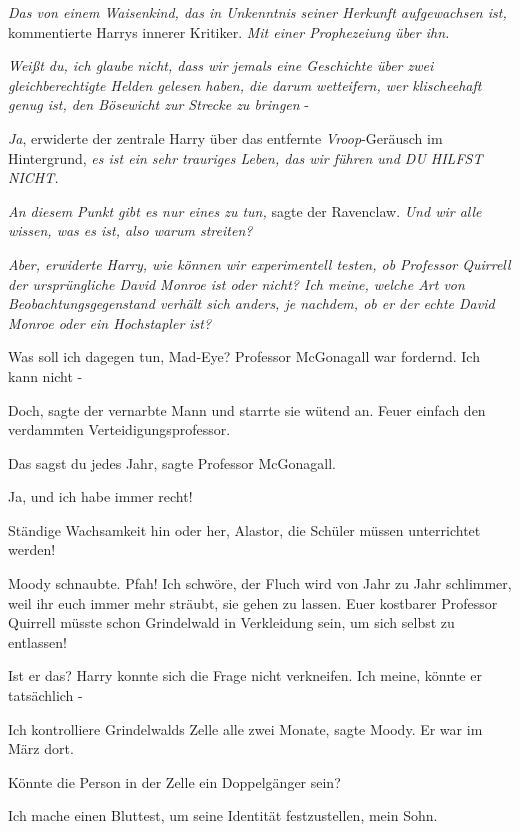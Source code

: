 \emph{Das von einem Waisenkind, das in Unkenntnis seiner Herkunft aufgewachsen
ist,} kommentierte Harrys innerer Kritiker. \emph{Mit einer Prophezeiung über
ihn. }

\emph{Weißt du, ich glaube nicht, dass wir jemals eine Geschichte über zwei
gleichberechtigte Helden gelesen haben, die darum wetteifern, wer klischeehaft
genug ist, den Bösewicht zur Strecke zu bringen }-

\emph{Ja}, erwiderte der zentrale Harry über das entfernte \emph{Vroop}-Geräusch
im Hintergrund, \emph{es ist ein sehr trauriges Leben, das wir führen und DU
HILFST NICHT. }

\emph{An diesem Punkt gibt es nur eines zu tun,} sagte der Ravenclaw. \emph{Und
wir alle wissen, was es ist, also warum streiten? }

\emph{Aber, erwiderte Harry, wie können wir experimentell testen, ob Professor Quirrell der ursprüngliche David Monroe ist oder nicht? Ich meine, welche Art von Beobachtungsgegenstand verhält sich anders, je nachdem, ob er der echte David Monroe oder ein Hochstapler ist?}

\glqq Was soll ich dagegen tun, Mad-Eye?\grqq{} Professor McGonagall war
fordernd. \glqq Ich kann nicht -\grqq{}

\glqq Doch\grqq{}, sagte der vernarbte Mann und starrte sie wütend an. \glqq
Feuer einfach den verdammten Verteidigungsprofessor.\grqq{}

\glqq Das sagst du jedes Jahr\grqq{}, sagte Professor McGonagall.

\glqq Ja, und ich habe immer recht!\grqq{}

\glqq Ständige Wachsamkeit hin oder her, Alastor, die Schüler müssen
unterrichtet werden!\grqq{}

Moody schnaubte. \glqq Pfah! Ich schwöre, der Fluch wird von Jahr zu Jahr
schlimmer, weil ihr euch immer mehr sträubt, sie gehen zu lassen. Euer kostbarer
Professor Quirrell müsste schon Grindelwald in Verkleidung sein, um sich selbst
zu entlassen!\grqq{}

\glqq Ist er das?\grqq{} Harry konnte sich die Frage nicht verkneifen. \glqq Ich
meine, könnte er tatsächlich -\grqq{}

\glqq Ich kontrolliere Grindelwalds Zelle alle zwei Monate\grqq{}, sagte Moody.
\glqq Er war im März dort.\grqq{}

\glqq Könnte die Person in der Zelle ein Doppelgänger sein?\grqq{}

\glqq Ich mache einen Bluttest, um seine Identität festzustellen, mein
Sohn.\grqq{}

